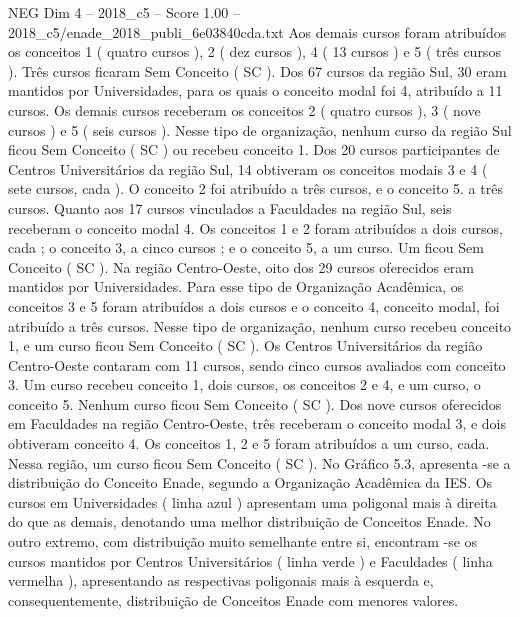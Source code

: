 \begin{textsample}{NEG Dim 4 – 2018\_c5 – Score 1.00 – 2018\_c5/enade\_2018\_publi\_6e03840cda.txt}
Aos demais cursos foram atribuídos os conceitos 1 ( quatro cursos ), 2 ( dez cursos ), 4 ( 13 cursos ) e 5 ( três cursos ).
Três cursos ficaram Sem Conceito ( SC ).
Dos 67 cursos da região Sul, 30 eram mantidos por Universidades, para os quais o conceito modal foi 4, atribuído a 11 cursos.
Os demais cursos receberam os conceitos 2 ( quatro cursos ), 3 ( nove cursos ) e 5 ( seis cursos ).
Nesse tipo de organização, nenhum curso da região Sul ficou Sem Conceito ( SC ) ou recebeu conceito 1.
Dos 20 cursos participantes de Centros Universitários da região Sul, 14 obtiveram os conceitos modais 3 e 4 ( sete cursos, cada ).
O conceito 2 foi atribuído a três cursos, e o conceito 5. a três cursos.
Quanto aos 17 cursos vinculados a Faculdades na região Sul, seis receberam o conceito modal 4.
Os conceitos 1 e 2 foram atribuídos a dois cursos, cada ; o conceito 3, a cinco cursos ; e o conceito 5, a um curso.
Um ficou Sem Conceito ( SC ).
Na região Centro-Oeste, oito dos 29 cursos oferecidos eram mantidos por Universidades.
Para esse tipo de Organização Acadêmica, os conceitos 3 e 5 foram atribuídos a dois cursos e o conceito 4, conceito modal, foi atribuído a três cursos.
Nesse tipo de organização, nenhum curso recebeu conceito 1, e um curso ficou Sem Conceito ( SC ).
Os Centros Universitários da região Centro-Oeste contaram com 11 cursos, sendo cinco cursos avaliados com conceito 3.
Um curso recebeu conceito 1, dois cursos, os conceitos 2 e 4, e um curso, o conceito 5.
Nenhum curso ficou Sem Conceito ( SC ).
Dos nove cursos oferecidos em Faculdades na região Centro-Oeste, três receberam o conceito modal 3, e dois obtiveram conceito 4.
Os conceitos 1, 2 e 5 foram atribuídos a um curso, cada.
Nessa região, um curso ficou Sem Conceito ( SC ).
No Gráfico 5.3, apresenta -se a distribuição do Conceito Enade, segundo a Organização Acadêmica da IES.
Os cursos em Universidades ( linha azul ) apresentam uma poligonal mais à direita do que as demais, denotando uma melhor distribuição de Conceitos Enade.
No outro extremo, com distribuição muito semelhante entre si, encontram -se os cursos mantidos por Centros Universitários ( linha verde ) e Faculdades ( linha vermelha ), apresentando as respectivas poligonais mais à esquerda e, consequentemente, distribuição de Conceitos Enade com menores valores.

\end{textsample}

